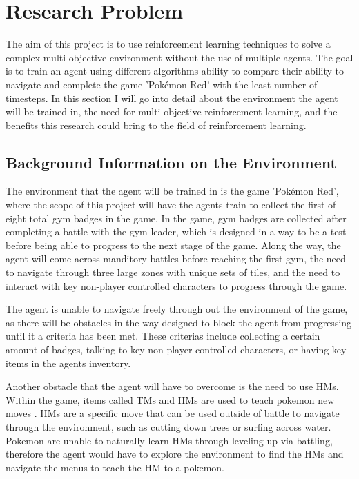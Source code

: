 \section{Research Problem}

The aim of this project is to use reinforcement learning techniques to solve a complex multi-objective environment without the use of multiple agents. The goal is to train an agent using different algorithms ability to compare their ability to navigate and complete the game 'Pokémon Red' with the least number of timesteps. In this section I will go into detail about the environment the agent will be trained in, the need for multi-objective reinforcement learning, and the benefits this research could bring to the field of reinforcement learning.

\subsection{Background Information on the Environment}

The environment that the agent will be trained in is the game 'Pokémon Red', where the scope of this project will have the agents train to collect the first of eight total gym badges in the game. In the game, gym badges are collected after completing a battle with the gym leader, which is designed in a way to be a test before being able to progress to the next stage of the game. Along the way, the agent will come across manditory battles before reaching the first gym, the need to navigate through three large zones with unique sets of tiles, and the need to interact with key non-player controlled characters to progress through the game. 

The agent is unable to navigate freely through out the environment of the game, as there will be obstacles in the way designed to block the agent from progressing until it a criteria has been met. These criterias include collecting a certain amount of badges, talking to key non-player controlled characters, or having key items in the agents inventory.  

Another obstacle that the agent will have to overcome is the need to use HMs. Within the game, items called TMs and HMs are used to teach pokemon new moves \cite{SerebiiTeam2016}. HMs are a specific move that can be used outside of battle to navigate through the environment, such as cutting down trees or surfing across water. Pokemon are unable to naturally learn HMs through leveling up via battling, therefore the agent would have to explore the environment to find the HMs and navigate the menus to teach the HM to a pokemon.

